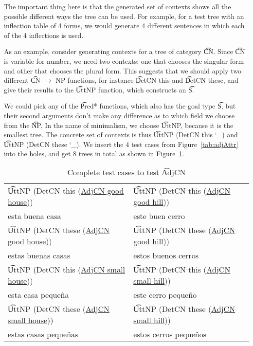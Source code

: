The important thing here is that the generated set of contexts shows
all the possible different ways the tree can be used. For example, for
a test tree with an inflection table of 4 forms, we would generate 4
different sentences in which each of the 4 inflections is used.

As an example, consider generating contexts for a tree of category \t{CN}.
Since \t{CN} is variable for number, we need two contexts: 
one that chooses the singular form and other that chooses
the plural form. 
This suggests that we should apply two different
\t{CN $\rightarrow$ NP} functions, for instance
\t{DetCN this} and \t{DetCN these}, and
give their results to the \t{UttNP} function, which constructs an \t{S}.

We could pick any of the \t{Pred*} functions, which also has the goal
type \t{S}, but their second arguments don't make any difference as to
which field we choose from the \t{NP}. In the name of minimalism, we
choose \t{UttNP}, because it is the smallest tree. The concrete set of
contexts is thus  \t{UttNP (DetCN this \char`_)}  and \t{UttNP (DetCN these \char`_)}.
We insert the 4 test cases from Figure~\ref{tab:adjAttr} into the
holes, and get 8 trees in total as shown in Figure~\ref{tab:testCases}.

\begin{table}
\centering
\begin{tabular}{| l | l |}
\hline
\t{UttNP (DetCN this
    (\underline{AdjCN good house}))} & \t{UttNP (DetCN this
                                            (\underline{AdjCN good hill}))} \\
esta buena casa          & este buen cerro \\ \hline
\t{UttNP (DetCN these
    (\underline{AdjCN good house}))} & \t{UttNP (DetCN these
                                            (\underline{AdjCN good hill}))} \\
estas buenas casas       & estos buenos cerros \\ \hline
\t{UttNP (DetCN this
    (\underline{AdjCN small house}))} & \t{UttNP (DetCN this
                                            (\underline{AdjCN small hill}))} \\
esta casa peque\~{n}a          & este cerro peque\~{n}o \\ \hline
\t{UttNP (DetCN these
    (\underline{AdjCN small house}))} & \t{UttNP (DetCN these
                                            (\underline{AdjCN small hill}))} \\
estas casas peque\~{n}as      & estos cerros peque\~{n}os \\ \hline
\end{tabular}
\caption{Complete test cases to test \t{AdjCN}}
\label{tab:testCases}
\end{table}

